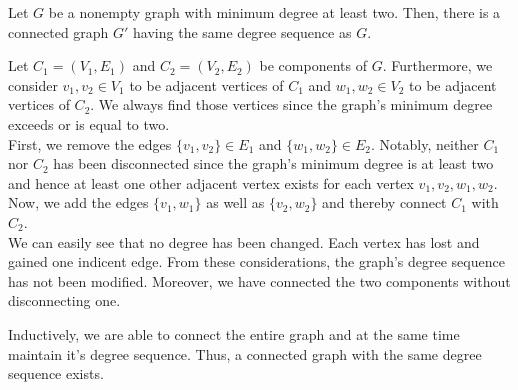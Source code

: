 \documentclass[a4paper]{article}
\begin{document}
\begin{solution}{5}
\begin{theorem}{Let $G$ be a nonempty graph with minimum degree at least two. Then, there is a connected graph $G'$ having the same degree sequence as $G$.}
\begin{center}
{
				}
			\end{center}

			Let $C_1 = (V_1, E_1)$ and $C_2 = (V_2, E_2)$ be components of $G$. Furthermore, we consider $v_1, v_2 \in V_1$ to be adjacent vertices of $C_1$ and $w_1, w_2 \in V_2$ to be adjacent vertices of $C_2$. We always find those vertices since the graph's minimum degree exceeds or is equal to two.\\

			First, we remove the edges $\{v_1, v_2\} \in E_1$ and $\{w_1, w_2\} \in E_2$. Notably, neither $C_1$ nor $C_2$ has been disconnected since the graph's minimum degree is at least two and hence at least one other adjacent vertex exists for each vertex $v_1, v_2, w_1, w_2$. Now, we add the edges $\{v_1, w_1\}$ as well as $\{v_2, w_2\}$ and thereby connect $C_1$ with $C_2$.\\
			
			We can easily see that no degree has been changed. Each vertex has lost and gained one indicent edge. From these considerations, the graph's degree sequence has not been modified. Moreover, we have connected the two components without disconnecting one.

			Inductively, we are able to connect the entire graph and at the same time maintain it's degree sequence. Thus, a connected graph with the same degree sequence exists.

		\end{theorem}
	\end{solution}
	\newpage
\end{document}

